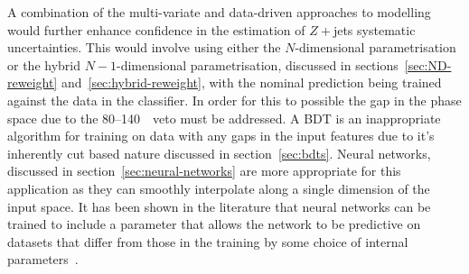 A combination of the multi-variate and data-driven approaches to modelling would
further enhance confidence in the estimation of $Z+$jets systematic
uncertainties. This would involve using either the $N$-dimensional
parametrisation or the hybrid $N-1$-dimensional parametrisation, discussed in
sections~\ref{sec:ND-reweight} and~\ref{sec:hybrid-reweight}, with the nominal
prediction being trained against the data in the classifier. In order for this
to possible the gap in the phase space due to the 80--140~\GeV\ veto must be
addressed. A BDT is an inappropriate algorithm for training on data with any
gaps in the input features due to it's inherently cut based nature discussed in
section~\ref{sec:bdts}. Neural networks, discussed in
section~\ref{sec:neural-networks} are more appropriate for this application as
they can smoothly interpolate along a single dimension of the input space. It
has been shown in the literature that neural networks can be trained to include
a parameter that allows the network to be predictive on datasets that differ
from those in the training by some choice of internal
parameters~\cite{param-hep, param-hep-2}.




